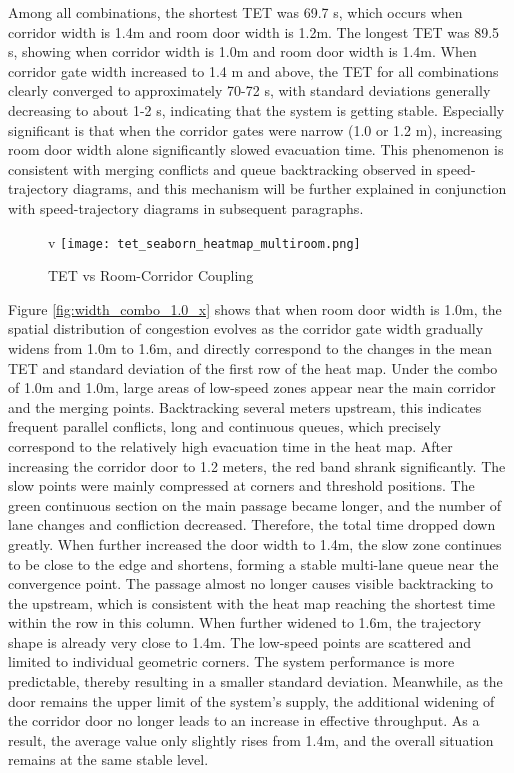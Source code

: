 Among all combinations, the shortest TET was 69.7 s, which occurs when corridor width is 1.4m and room door width is 1.2m. The longest TET was 89.5 s, showing when corridor width is 1.0m and room door width is 1.4m. When corridor gate width increased to 1.4 m and above, the TET for all combinations clearly converged to approximately 70-72 s, with standard deviations generally decreasing to about 1-2 s, indicating that the system is getting stable. Especially significant is that when the corridor gates were narrow (1.0 or 1.2 m), increasing room door width alone significantly slowed evacuation time. This phenomenon is consistent with merging conflicts and queue backtracking observed in speed-trajectory diagrams, and this mechanism will be further explained in conjunction with speed-trajectory diagrams in subsequent paragraphs.
\begin{figure}[h]v
    \centering
    \texttt{[image: tet\_seaborn\_heatmap\_multiroom.png]}
    \caption{TET vs Room-Corridor Coupling}
    \label{fig:tet_vs_room_corridor_coupling}
\end{figure}

Figure \ref{fig:width_combo_1.0_x} shows that when room door width is 1.0m, the spatial distribution of congestion evolves as the corridor gate width gradually widens from 1.0m to 1.6m, and directly correspond to the changes in the mean TET and standard deviation of the first row of the heat map. Under the combo of 1.0m and 1.0m, large areas of low-speed zones appear near the main corridor and the merging points. Backtracking several meters upstream, this indicates frequent parallel conflicts, long and continuous queues, which precisely correspond to the relatively high evacuation time in the heat map. After increasing the corridor door to 1.2 meters, the red band shrank significantly. The slow points were mainly compressed at corners and threshold positions. The green continuous section on the main passage became longer, and the number of lane changes and confliction decreased. Therefore, the total time dropped down greatly. When further increased the door width to 1.4m, the slow zone continues to be close to the edge and shortens, forming a stable multi-lane queue near the convergence point. The passage almost no longer causes visible backtracking to the upstream, which is consistent with the heat map reaching the shortest time within the row in this column. When further widened to 1.6m, the trajectory shape is already very close to 1.4m. The low-speed points are scattered and limited to individual geometric corners. The system performance is more predictable, thereby resulting in a smaller standard deviation. Meanwhile, as the door remains the upper limit of the system's supply, the additional widening of the corridor door no longer leads to an increase in effective throughput. As a result, the average value only slightly rises from 1.4m, and the overall situation remains at the same stable level.

